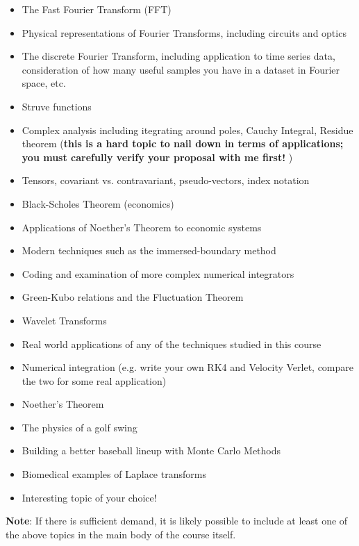\documentclass[12pt]{article}
\begin{document}
{\begin{description}
        \begin{itemize}
          \item The Fast Fourier Transform (FFT)
          \item Physical representations of Fourier Transforms, including circuits and optics
          \item The discrete Fourier Transform, including application to time series data, consideration of how many useful samples you have in a dataset in Fourier space, etc.
          \item Struve functions
          \item Complex analysis including itegrating around poles, Cauchy
                Integral, Residue theorem (\textbf{this is a hard topic to nail
                down in terms of applications; you must carefully verify your
                proposal with me first! })
          \item Tensors, covariant vs. contravariant, pseudo-vectors, index notation
          \item Black-Scholes Theorem (economics)
          \item Applications of Noether's Theorem to economic systems
          \item Modern techniques such as the immersed-boundary method
          \item Coding and examination of more complex numerical integrators
          \item Green-Kubo relations and the Fluctuation Theorem
          \item Wavelet Transforms
          \item Real world applications of any of the techniques studied in this course
          \item Numerical integration (e.g. write your own RK4 and Velocity 
                Verlet, compare the two for some real application)
          \item Noether's Theorem
          \item The physics of a golf swing
          \item Building a better baseball lineup with Monte Carlo Methods
          \item Biomedical examples of Laplace transforms
          \item Interesting topic of your choice! 
        \end{itemize}

\textbf{Note}: If there is sufficient demand, it is likely possible to include at least one of the above topics in the main body of the course itself.
        

\end{description}}
\end{document}
